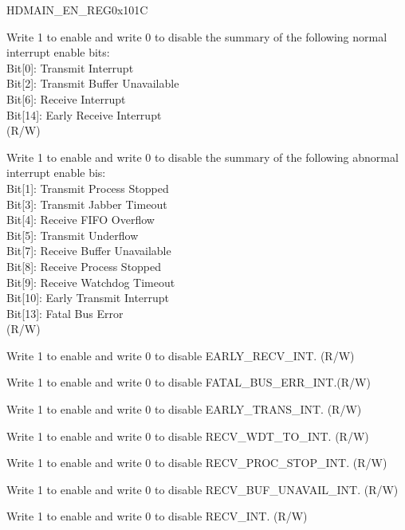 \begin{register}{H}{DMAIN\_EN\_REG}{0x101C}\label{regdesc:DMAINENREG}
%
%
%
%
%
%
%
%
%
%
%
%
%
%
%
%
%
\regnewline%
\begin{regdesc}\begin{reglist}
\item [DMAIN\_NISE] Write 1 to enable and write 0 to disable the summary of the following normal interrupt enable bits:\\
Bit[0]: Transmit Interrupt\\
Bit[2]: Transmit Buffer Unavailable\\
Bit[6]: Receive Interrupt\\
Bit[14]: Early Receive Interrupt\\
(R/W)
\item [DMAIN\_AISE] Write 1 to enable and write 0 to disable the summary of the following abnormal interrupt enable bis:\\
Bit[1]: Transmit Process Stopped\\
Bit[3]: Transmit Jabber Timeout\\
Bit[4]: Receive FIFO Overflow\\
Bit[5]: Transmit Underflow\\
Bit[7]: Receive Buffer Unavailable\\
Bit[8]: Receive Process Stopped\\
Bit[9]: Receive Watchdog Timeout\\
Bit[10]: Early Transmit Interrupt\\
Bit[13]: Fatal Bus Error\\(R/W)
\item [DMAIN\_ERIE] Write 1 to enable and write 0 to disable EARLY\_RECV\_INT. (R/W)
\item [DMAIN\_FBEE] Write 1 to enable and write 0 to disable FATAL\_BUS\_ERR\_INT.(R/W)
\item [DMAIN\_ETIE] Write 1 to enable and write 0 to disable EARLY\_TRANS\_INT. (R/W)
\item [DMAIN\_RWTE] Write 1 to enable and write 0 to disable RECV\_WDT\_TO\_INT. (R/W)
\item [DMAIN\_RSE] Write 1 to enable and write 0 to disable RECV\_PROC\_STOP\_INT. (R/W)
\item [DMAIN\_RBUE] Write 1 to enable and write 0 to disable RECV\_BUF\_UNAVAIL\_INT. (R/W)
\item [DMAIN\_RIE] Write 1 to enable and write 0 to disable RECV\_INT. (R/W)


\item[Continued on the next page...]
\end{reglist}\end{regdesc}
\end{register}

